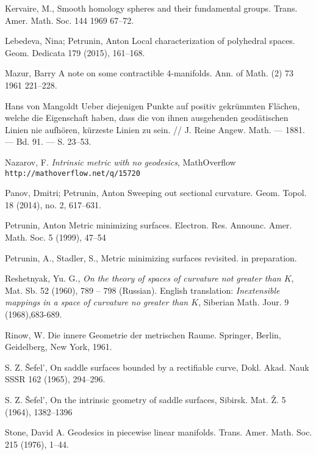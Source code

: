 \begin{thebibliography}{52}
 Kervaire, M., 
Smooth homology spheres and their fundamental groups.
Trans. Amer. Math. Soc. 144 1969 67--72.

 Lebedeva, Nina; Petrunin, Anton Local characterization of polyhedral spaces. Geom. Dedicata 179 (2015), 161--168.

Mazur, Barry A note on some contractible 4-manifolds. Ann. of Math. (2) 73 1961 221--228.

Hans von Mangoldt Ueber diejenigen Punkte auf positiv gekr\"ummten Fl\"achen, welche die Eigenschaft haben, dass die von ihnen ausgehenden geod\"atischen Linien nie aufh\"oren, k\"urzeste Linien zu sein. // J. Reine Angew. Math. --- 1881. --- Bd. 91. --- S. 23--53.

Nazarov, F.
\textit{Intrinsic metric with no geodesics},
MathOverflow \texttt{http://mathoverflow.net/q/15720}

Panov, Dmitri; Petrunin, Anton
Sweeping out sectional curvature. 
Geom. Topol. 18 (2014), no. 2, 617--631. 

 Petrunin, Anton
Metric minimizing surfaces. 
Electron. Res. Announc. Amer. Math. Soc. 5 (1999), 47--54

  Petrunin, A., Stadler, S., 
Metric minimizing surfaces revisited. in preparation.

Reshetnyak, Yu. G.,
\textit{On the theory of spaces of curvature not greater than $K$},
 Mat. Sb. 52 (1960), 789 -- 798 (Russian).
English translation: \textit{Inextensible mappings in a space of curvature
no greater than $K$}, Siberian Math. Jour. 9 (1968),683-689.

Rinow, W. Die innere Geometrie der metrischen Raume. Springer, Berlin, Geidelberg, New York, 1961.

 S. Z. \v{S}efel', On saddle surfaces bounded by a rectifiable curve, Dokl. Akad. Nauk SSSR 162 (1965), 294--296.

 S. Z. \v{S}efel', On the intrinsic geometry of saddle surfaces, Sibirsk. Mat. \v{Z}. 5 (1964), 1382--1396

Stone, David A.
Geodesics in piecewise linear manifolds.
Trans. Amer. Math. Soc. 215 (1976), 1--44.


\end{thebibliography}

